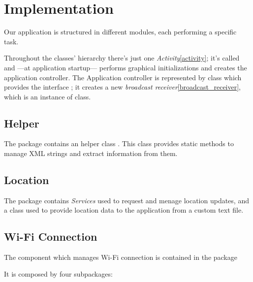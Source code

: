 \section{Implementation}
\label{sec:implementation}

Our application is structured in different modules, each performing a specific task.

Throughout the classes' hierarchy there's just one \textit{Activity}\ref{activity}; it's called  and —at application startup— performs graphical initializations and creates the application controller. The Application controller is represented by  class which provides the interface ; it creates a new \textit{broadcast receiver}\ref{broadcast_receiver}, which is an instance of  class.

\subsection{Helper}
The package  contains an helper class . This class provides static methods to manage XML strings and extract information from them.

\subsection{Location}

The package  contains \textit{Services} used to request and menage location updates, and a  class used to provide location data to the application from a custom text file.

\subsection{Wi-Fi Connection}
The component which manages Wi-Fi connection is contained in the package
\begin{center}
\end{center} 
It is composed by four subpackages:
	\\
